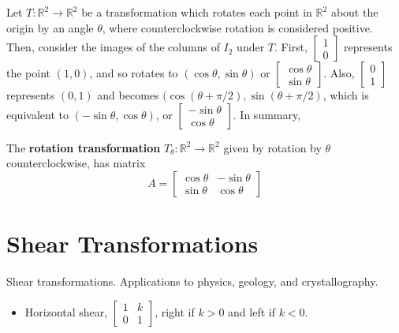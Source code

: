 \documentclass[letterpaper,12pt]{article}
\begin{document}
Let $T: \mathbb{R}^2 \rightarrow \mathbb{R}^2$ be a transformation which rotates each point in $\mathbb{R}^2$ about the origin by an angle $\theta$, where counterclockwise rotation is considered positive. Then, consider the images of the columns of $I_2$ under $T$. First, $\begin{bmatrix} 1 \\ 0 \end{bmatrix}$ represents the point $(1,0)$, and so rotates to $(\cos{\theta}, \sin{\theta})$ or $\begin{bmatrix} \cos{\theta} \\ \sin{\theta} \end{bmatrix}$. Also, $\begin{bmatrix} 0 \\ 1 \end{bmatrix}$ represents $(0,1)$ and becomes $(\cos(\theta + \pi/2), \sin(\theta + \pi/2)$, which is equivalent to $(-\sin{\theta}, \cos{\theta})$, or $\begin{bmatrix} -\sin{\theta} \\ \cos{\theta} \end{bmatrix}$. In summary,

\begin{definition}
The \textbf{rotation transformation} $T_{\theta}: \mathbb{R}^2 \rightarrow \mathbb{R}^2$ given by rotation by $\theta$ counterclockwise, has matrix
\begin{equation*}
    A = \begin{bmatrix} \cos{\theta} & -\sin{\theta} \\ \sin{\theta} & \cos{\theta} \end{bmatrix}
\end{equation*}
\end{definition}

\section*{Shear Transformations}
Shear transformations. Applications to physics, geology, and crystallography.

\begin{itemize}
    \item Horizontal shear, $\begin{bmatrix} 1 & k \\ 0 & 1 \end{bmatrix}$, right if $k > 0$ and left if $k < 0$.
\end{itemize}
\end{document}
